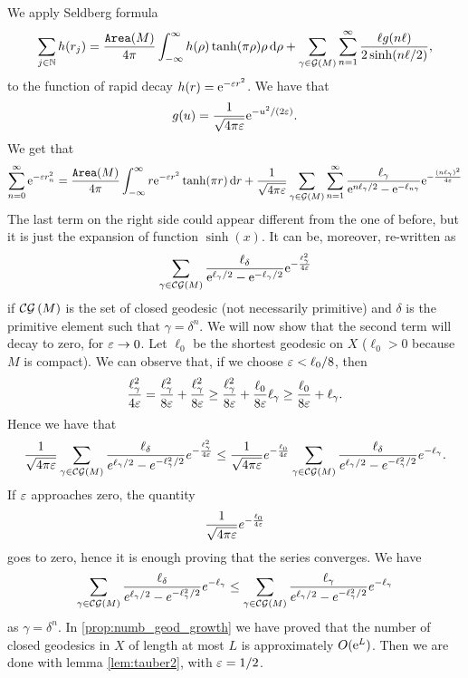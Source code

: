 \begin{prf} 
We apply Seldberg formula 
\[
\sum_{j\in\mathbb{N}}h(r_{j})=\frac{\operatorname{\mathtt{Area}}(M)}{4\pi}\int_{-\infty}^{\infty}h(\rho)\tanh(\pi\rho)\rho\mathop{}\!\mathrm{d}\rho+\sum_{\gamma\in\mathcal{G}\left(M\right)}\sum_{n=1}^{\infty}\frac{\ell g(n\ell)}{2\sinh(n\ell/2)},
\]
to the function of rapid decay $h(r)=\mathrm{e}^{-\varepsilon r^{2}}$. We have that
\[
g(u)=\frac{1}{\sqrt{4\pi\varepsilon}}\mathrm{e}^{-u^{2}/(2\varepsilon)}.
\]
We get that
\[
\sum_{n=0}^{\infty}\mathrm{e}^{-\varepsilon r_{n}^{2}}=\frac{\operatorname{\mathtt{Area}}(M)}{4\pi}\int_{-\infty}^{\infty}r\mathrm{e}^{-\varepsilon r^{2}}\tanh(\pi r)\mathop{}\!\mathrm{d} r+\frac{1}{\sqrt{4\pi\varepsilon}}\sum_{\gamma\in\mathcal{G}\left(M\right)}\sum_{n=1}^{\infty}\frac{\ell_{\gamma}}{\mathrm{e}^{n\ell_{\gamma}/2}-\mathrm{e}^{-\ell_{n\gamma}}}\mathrm{e}^{-\frac{(n\ell_{\gamma})^{2}}{4\varepsilon}}
\]
The last term on the right side could appear different from the one of before, but it is just the expansion of function $\sinh(x)$. It can be, moreover, re-written as 
\[
\sum_{\gamma\in\mathcal{CG}\left(M\right)}\frac{\ell_{\delta}}{\mathrm{e}^{\ell_{\gamma}/2}-\mathrm{e}^{-\ell_{\gamma}/2}}\mathrm{e}^{-\frac{\ell_{\gamma}^{2}}{4\varepsilon}}
\]
if $\mathcal{CG}\left(M\right)$ is the set of closed geodesic (not necessarily primitive) and $\delta$ is the primitive element such that $\gamma=\delta^{n}$. We will now show that the second term will decay to zero, for $\varepsilon\to0$. Let $\ell_{0}$ be the shortest geodesic on $X$ ($\ell_{0}>0$ because $M$ is compact). We can observe that, if we choose $\varepsilon<\ell_{0}/8$, then
\[
\frac{\ell_{\gamma}^{2}}{4\varepsilon}=\frac{\ell_{\gamma}^{2}}{8\varepsilon}+\frac{\ell_{\gamma}^{2}}{8\varepsilon}\geq \frac{\ell_{\gamma}^{2}}{8\varepsilon} +\frac{\ell_{0}}{8\varepsilon}\ell_{\gamma}\geq \frac{\ell_{0}}{8\varepsilon}+\ell_{\gamma}.
\]
Hence we have that
\[
\frac{1}{\sqrt{4\pi\varepsilon}}\sum_{\gamma\in\mathcal{CG}\left(M\right)}\frac{\ell_{\delta}}{e^{\ell_{\gamma}/2}-e^{-\ell_{\gamma}^{2}/2}}e^{-\frac{\ell_{\gamma}^{2}}{4\varepsilon}}\leq \frac{1}{\sqrt{4\pi\varepsilon}}e^{-\frac{\ell_{0}}{4\varepsilon}}\sum_{\gamma\in \mathcal{CG}\left(M\right)}\frac{\ell_{\delta}}{e^{\ell_{\gamma}/2}-e^{-\ell_{\gamma}^{2}/2}}e^{-\ell_{\gamma}}.
\]
If $\varepsilon$ approaches zero, the quantity 
\[
\frac{1}{\sqrt{4\pi\varepsilon}}e^{-\frac{\ell_{0}}{4\varepsilon}}
\]
goes to zero, hence it is enough proving that the series converges. We have 
\[
\sum_{\gamma\in \mathcal{CG}\left(M\right)}\frac{\ell_{\delta}}{e^{\ell_{\gamma}/2}-e^{-\ell_{\gamma}^{2}/2}}e^{-\ell_{\gamma}}\leq \sum_{\gamma\in \mathcal{CG}\left(M\right)}\frac{\ell_{\gamma}}{e^{\ell_{\gamma}/2}-e^{-\ell_{\gamma}^{2}/2}}e^{-\ell_{\gamma}}
\]
as $\gamma=\delta^{n}$. In \ref{prop:numb_geod_growth} we have proved that the number of closed geodesics in $X$ of length at most $L$ is approximately $O(\mathrm{e}^{L})$. Then we are done with lemma \ref{lem:tauber2}, with $\varepsilon=1/2$.\\ 

\end{prf}
